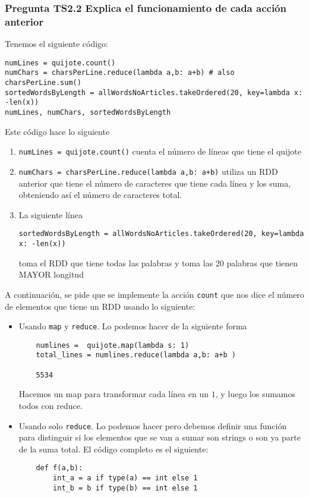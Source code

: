 \documentclass[11pt]{article}
\def\inline{\lstinline[basicstyle=\ttfamily,keywordstyle={}]}
\begin{document}
{{\begin{itemize}
\end{itemize}

\subsubsection*{ Pregunta TS2.2 Explica el funcionamiento de cada acción anterior }

Tenemos el siguiente código:
\begin{verbatim}
numLines = quijote.count()
numChars = charsPerLine.reduce(lambda a,b: a+b) # also charsPerLine.sum()
sortedWordsByLength = allWordsNoArticles.takeOrdered(20, key=lambda x: -len(x))
numLines, numChars, sortedWordsByLength
\end{verbatim}

Este código hace lo siguiente
\begin{enumerate}
\item \inline{numLines = quijote.count()} cuenta el número de líneas que tiene el quijote
\item \inline{numChars = charsPerLine.reduce(lambda a,b: a+b)} utiliza un RDD anterior que tiene el número de caracteres que tiene cada línea y los suma, obteniendo así el número de caracteres total.
\item La siguiente línea
\begin{verbatim}
sortedWordsByLength = allWordsNoArticles.takeOrdered(20, key=lambda x: -len(x))
\end{verbatim} 
toma el RDD que tiene todas las palabras y toma las 20 palabras que tienen MAYOR longitud
\end{enumerate}

A continuación, se pide que se implemente la acción \inline{count} que nos dice el número de elementos que tiene un RDD usando lo siguiente:
\begin{itemize}
    \item Usando \inline{map} y \inline{reduce}. Lo podemos hacer de la siguiente forma
    \begin{verbatim}
    numlines =  quijote.map(lambda s: 1)
    total_lines = numlines.reduce(lambda a,b: a+b )

    5534
    \end{verbatim}

    Hacemos un map para transformar cada línea en un $1$, y luego los sumamos todos con reduce.

    \item Usando solo \inline{reduce}. Lo podemos hacer pero debemos definir una función para distinguir si los elementos que se van a sumar son strings o son ya parte de la suma total. El código completo es el siguiente:
    \begin{verbatim}
    def f(a,b):
        int_a = a if type(a) == int else 1
        int_b = b if type(b) == int else 1
      

\end{verbatim}
\end{itemize}}}
\end{document}

